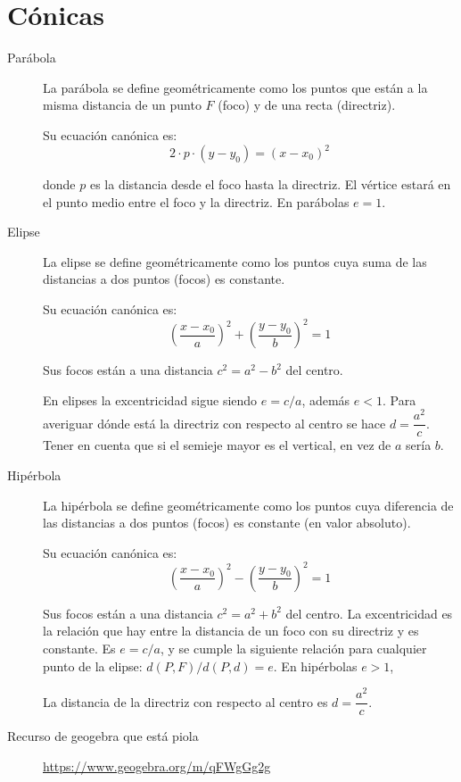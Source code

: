 \section{Cónicas}


\begin{description}
    \item [Parábola]\hfill

    La parábola se define geométricamente como los puntos que están a la misma distancia de un punto $F$ (foco) y de una recta (directriz).

    Su ecuación canónica es: $$2\cdot p \cdot (y-y_0) = (x-x_0)^2$$
    
    donde $p$ es la distancia desde el foco hasta la directriz. El vértice estará en el punto medio entre el foco y la directriz. En parábolas $e=1$.

    \item [Elipse]\hfill

    La elipse se define geométricamente como los puntos cuya suma de las distancias a dos puntos (focos) es constante. 

    Su ecuación canónica es:
    $$\left(\dfrac{x-x_0}{a}\right)^2 + \left(\dfrac{y-y_0}{b}\right)^2 = 1$$

    Sus focos están a una distancia $c^2 = a^2 - b^2$ del centro.

    En elipses la excentricidad sigue siendo $e=c/a$, además $e<1$. Para averiguar dónde está la directriz con respecto al centro se hace $d=\dfrac{a^2}{c}$. Tener en cuenta que si el semieje mayor es el vertical, en vez de $a$ sería $b$.

    \item [Hipérbola]\hfill

    La hipérbola se define geométricamente como los puntos cuya diferencia de las distancias a dos puntos (focos) es constante (en valor absoluto). 

    Su ecuación canónica es:
    $$\left(\dfrac{x-x_0}{a}\right)^2 - \left(\dfrac{y-y_0}{b}\right)^2 = 1$$

    Sus focos están a una distancia $c^2 = a^2 + b^2$ del centro. La excentricidad es la relación que hay entre la distancia de un foco con su directriz y es constante. Es $e=c/a$, y se cumple la siguiente relación para cualquier punto de la elipse: $d(P,F)/d(P,d)=e$. En hipérbolas $e>1$,

    La distancia de la directriz con respecto al centro es $d=\dfrac{a^2}{c}$.

    \item [Recurso de geogebra que está piola]\hfill

    \url{https://www.geogebra.org/m/qFWgGg2g}
\end{description}